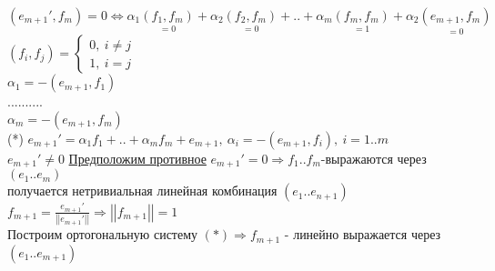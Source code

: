 $(e_{m+1}',f_m)=0 \Leftrightarrow \alpha_1 \underset {=0} {(f_1,f_m)} + \alpha_2 \underset {=0} {(f_2,f_m)} + .. + \alpha_m \underset {=1} {(f_m,f_m)} + \alpha_2 \underset {=0} {(e_{m+1},f_m)}$ \\
$(f_i,f_j) = \left\{ \begin{matrix}
\mbox{$0, \ i \ne j $} \\
\mbox{$1, \ i=j$}
\end{matrix}\right.$ \\
$\alpha_1=-(e_{m+1},f_1)$ \\
.......... \\
$\alpha_m=-(e_{m+1},f_m)$ \\
(*) $e_{m+1}'=\alpha_1 f_1 + .. + \alpha_m f_m + e_{m+1}, \ \alpha_i=-(e_{m+1},f_i), \ i=1..m$ \\
$e_{m+1}' \ne 0 $ \underline{Предположим противное} $e_{m+1}'=0 \Rightarrow f_1..f_m$-выражаются через $(e_1..e_m)$ \\
получается нетривиальная линейная комбинация $(e_1..e_{n+1})$ \\
$f_{m+1}=\frac{e_{m+1}'}{\left| \left| e_{m+1}' \right| \right|} \Rightarrow \left| \left| f_{m+1} \right| \right| =1 $ \\
Построим ортогональную систему $ (*) \Rightarrow f_{m+1}$ - линейно выражается через $(e_1..e_{m+1})$ \\ 
